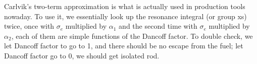 \documentclass{school-22.211-notes}
\begin{document}
\begin{enumerate}
Carlvik's two-term approximation is what is actually used in production tools nowaday. To use it, we essentially look up the resonance integral (or group xs) twice, once with $\sigma_e$ multiplied by $\alpha_1$ and the second time with $\sigma_e$ multiplied by $\alpha_2$, each of them are simple functions of the Dancoff factor. To double check, we let Dancoff factor to go to 1, and there should be no escape from the fuel; let Dancoff factor go to 0, we should get isolated rod. 

\end{enumerate}
\end{document}
